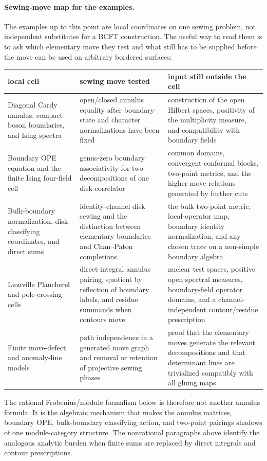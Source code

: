 \paragraph{Sewing-move map for the examples.}
The examples up to this point are local coordinates on one sewing problem,
not independent substitutes for a BCFT construction.  The useful way to read
them is to ask which elementary move they test and what still has to be
supplied before the move can be used on arbitrary bordered surfaces:
\begin{center}
\small
\begin{tabular}{
  >{\raggedright\arraybackslash}p{}
  >{\raggedright\arraybackslash}p{}
  >{\raggedright\arraybackslash}p{}}
\hline
local cell & sewing move tested & input still outside the cell \\
\hline
Diagonal Cardy annulus, compact-boson boundaries, and Ising spectra
& open/closed annulus equality after boundary-state and character
normalizations have been fixed
& construction of the open Hilbert spaces, positivity of the multiplicity
measure, and compatibility with boundary fields \\
Boundary OPE equation and the finite Ising four-field cell
& genus-zero boundary associativity for two decompositions of one disk
correlator
& common domains, convergent conformal blocks, two-point metrics, and the
higher move relations generated by further cuts \\
Bulk-boundary normalization, disk classifying coordinates, and direct sums
& identity-channel disk sewing and the distinction between elementary
boundaries and Chan--Paton completions
& the bulk two-point metric, local-operator map, boundary identity
normalization, and any chosen trace on a non-simple boundary algebra \\
Liouville Plancherel and pole-crossing cells
& direct-integral annulus pairing, quotient by reflection of boundary labels,
and residue summands when contours move
& nuclear test spaces, positive open spectral measures, boundary-field
operator domains, and a channel-independent contour/residue prescription \\
Finite move-defect and anomaly-line models
& path independence in a generated move graph and removal or retention of
projective sewing phases
& proof that the elementary moves generate the relevant decompositions and
that determinant lines are trivialized compatibly with all gluing maps \\
\hline
\end{tabular}
\end{center}
The rational Frobenius/module formalism below is therefore not another
annulus formula.  It is the algebraic mechanism that makes the annulus
matrices, boundary OPE, bulk-boundary classifying action, and two-point
pairings shadows of one module-category structure.  The nonrational paragraphs
above identify the analogous analytic burden when finite sums are replaced by
direct integrals and contour prescriptions.

